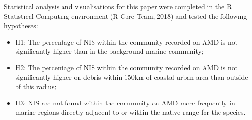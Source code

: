 \documentclass[a4paper, nobind]{templates/ociamthesis}
\providecommand{\tightlist}{%
  \setlength{\itemsep}{0pt}\setlength{\parskip}{0pt}}
\begin{document}
\begin{table}

\caption[Material type definitions]{\label{tab:materialDefine}Material type designations used to classify the broader range of materials found in the OAAMD to provide adequate sample sizes in the following statistical analyses.}
\centering
{}
\end{table}

Statistical analysis and visualisations for this paper were completed in the R Statistical Computing environment (R Core Team, 2018) and tested the following hypotheses:

\begin{itemize}
\tightlist
\item
  H1: The percentage of NIS within the community recorded on AMD is not significantly higher than in the background marine community;
\item
  H2: The percentage of NIS within the community recorded on AMD is not significantly higher on debris within 150km of coastal urban area than outside of this radius;
\item
  H3: NIS are not found within the community on AMD more frequently in marine regions directly adjacent to or within the native range for the species.
\end{itemize}
\end{document}
